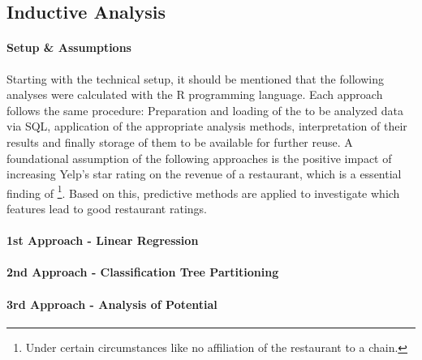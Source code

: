 \subsection{Inductive Analysis}
\label{subsec:analysis}


\paragraph{Setup \& Assumptions}
Starting with the technical setup, it should be mentioned that the following analyses were calculated with the R programming language. Each approach follows the same procedure: Preparation and loading of the to be analyzed data via SQL, application of the appropriate analysis methods, interpretation of their results and finally storage of them to be available for further reuse.
A foundational assumption of the following approaches is the positive impact of increasing Yelp's star rating on the revenue of a restaurant, which is a essential finding of \cite{CaseOfYelp}\footnote{Under certain circumstances like no affiliation of the restaurant to a chain.}. Based on this, predictive methods are applied  to investigate which features lead to good restaurant ratings.



\paragraph{1st Approach - Linear Regression}


\paragraph{2nd Approach - Classification Tree Partitioning}


\paragraph{3rd Approach - Analysis of Potential}


